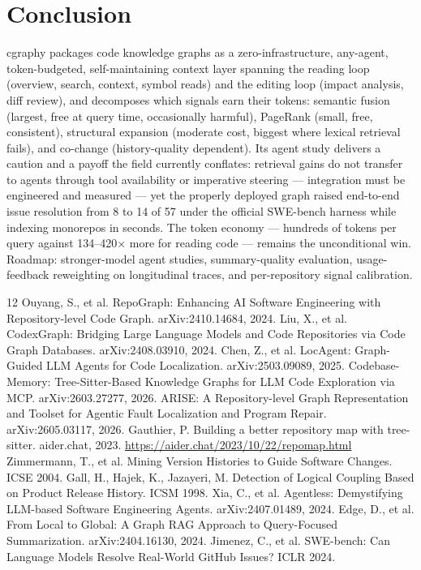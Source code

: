 \documentclass[11pt]{article}
\begin{document}
\section{Conclusion}
cgraphy packages code knowledge graphs as a zero-infrastructure,
any-agent, token-budgeted, self-maintaining context layer spanning the
reading loop (overview, search, context, symbol reads) and the editing
loop (impact analysis, diff review), and decomposes which signals earn
their tokens: semantic fusion (largest, free at query time, occasionally
harmful), PageRank (small, free, consistent), structural expansion
(moderate cost, biggest where lexical retrieval fails), and co-change
(history-quality dependent). Its agent study delivers a caution and a
payoff the field currently conflates: retrieval gains do not transfer to
agents through tool availability or imperative steering --- integration
must be engineered and measured --- yet the properly deployed graph
raised end-to-end issue resolution from 8 to 14 of 57 under the official
SWE-bench harness while indexing monorepos in seconds. The token economy
--- hundreds of tokens per query against 134--420$\times$ more for
reading code --- remains the unconditional win. Roadmap: stronger-model
agent studies, summary-quality evaluation, usage-feedback reweighting on
longitudinal traces, and per-repository signal calibration.

\begin{thebibliography}{12}
 Ouyang, S., et al. RepoGraph: Enhancing AI Software
Engineering with Repository-level Code Graph. arXiv:2410.14684, 2024.
 Liu, X., et al. CodexGraph: Bridging Large Language
Models and Code Repositories via Code Graph Databases. arXiv:2408.03910,
2024.
 Chen, Z., et al. LocAgent: Graph-Guided LLM Agents for
Code Localization. arXiv:2503.09089, 2025.
 Codebase-Memory: Tree-Sitter-Based Knowledge
Graphs for LLM Code Exploration via MCP. arXiv:2603.27277, 2026.
 ARISE: A Repository-level Graph Representation and Toolset
for Agentic Fault Localization and Program Repair. arXiv:2605.03117, 2026.
 Gauthier, P. Building a better repository map with
tree-sitter. aider.chat, 2023.
\url{https://aider.chat/2023/10/22/repomap.html}
 Zimmermann, T., et al. Mining Version Histories to
Guide Software Changes. ICSE 2004.
 Gall, H., Hajek, K., Jazayeri, M. Detection of Logical
Coupling Based on Product Release History. ICSM 1998.
 Xia, C., et al. Agentless: Demystifying LLM-based
Software Engineering Agents. arXiv:2407.01489, 2024.
 Edge, D., et al. From Local to Global: A Graph RAG
Approach to Query-Focused Summarization. arXiv:2404.16130, 2024.
 Jimenez, C., et al. SWE-bench: Can Language Models
Resolve Real-World GitHub Issues? ICLR 2024.
\end{thebibliography}
\end{document}
